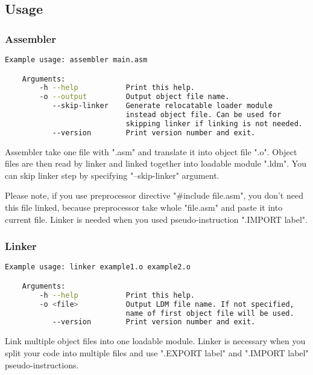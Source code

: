 \subsection{Usage}

\subsubsection{Assembler}

\begin{lstlisting}[language=bash, frame=single]
    Example usage: assembler main.asm

    Arguments:
        -h --help           Print this help.
        -o --output         Output object file name.
           --skip-linker    Generate relocatable loader module
                            instead object file. Can be used for
                            skipping linker if linking is not needed.
           --version        Print version number and exit.
\end{lstlisting}

Assembler take one file with ".asm" and translate it into object file ".o".
Object files are then read by linker and linked together into loadable module
".ldm". You can skip linker step by specifying "--skip-linker" argument.

Please note, if you use preprocessor directive "\#include file.asm", you don't
need this file linked, because preprocessor take whole "file.asm" and paste it
into current file. Linker is needed when you used pseudo-instruction ".IMPORT
label".

\subsubsection{Linker}

\begin{lstlisting}[language=bash, frame=single]
    Example usage: linker example1.o example2.o

    Arguments:
        -h --help           Print this help.
        -o <file>           Output LDM file name. If not specified,
                            name of first object file will be used.
           --version        Print version number and exit.
\end{lstlisting}

Link multiple object files into one loadable module. Linker is necessary when
you split your code into multiple files and use ".EXPORT label" and ".IMPORT
label" pseudo-instructions.

